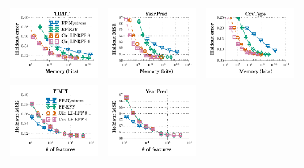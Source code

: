 \begin{figure}
	\centering
	\begin{small}
	\begin{tabular}{@{\hskip -0.05in}c@{\hskip -0.1in}c@{\hskip -0.1in}c@{\hskip -0.05in}}
		\includegraphics[width=0.34\linewidth]{figures/timit_error_vs_n_memory.pdf} &	
		\includegraphics[width=0.34\linewidth]{figures/yearpred_MSE_vs_n_memory.pdf} &
		\includegraphics[width=0.34\linewidth]{figures/covtype_error_vs_n_memory.pdf} \vspace{-0.1in}\\
		\includegraphics[width=0.34\linewidth]{figures/timit_error_vs_n_feat.pdf} &	
		\includegraphics[width=0.34\linewidth]{figures/yearpred_MSE_vs_n_feat.pdf} &

\end{tabular}
\end{small}
\end{figure}
